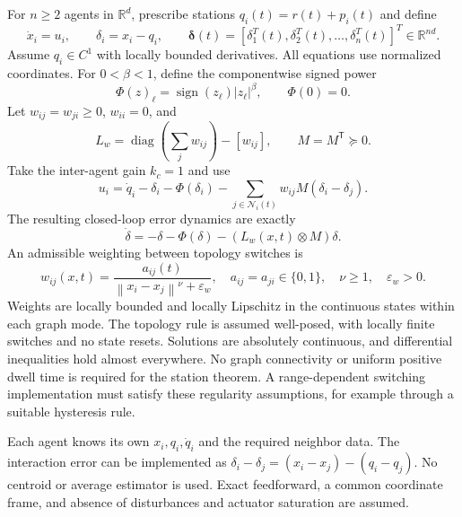 \documentclass[11pt,a4paper]{article}
\theoremstyle{remark}
\newcommand{\R}{\mathbb R}
\newcommand{\norm}[1]{\left\lVert#1\right\rVert}
\newcommand{\transpose}{^{\mathsf T}}
\newcommand{\epsreg}{\varepsilon_w}
\begin{document}
For $n\ge2$ agents in $\R^d$, prescribe stations $q_i(t)=r(t)+p_i(t)$ and define
\begin{equation}
\dot x_i=u_i,\qquad \delta_i=x_i-q_i,\qquad
\boldsymbol{\delta}(t) = [\delta_1^T(t), \delta_2^T(t), \dots, \delta_n^T(t)]^T \in \mathbb{R}^{nd}.
\label{eq:plant}
\end{equation}
Assume $q_i\in C^1$ with locally bounded derivatives. All equations use normalized coordinates. For $0<\beta<1$, define the componentwise signed power
\begin{equation}
\Phi(z)_\ell=\operatorname{sign}(z_\ell)|z_\ell|^\beta,
\qquad \Phi(0)=0.
\label{eq:phi}
\end{equation}
Let $w_{ij}=w_{ji}\ge0$, $w_{ii}=0$, and
\begin{equation}
L_w=\operatorname{diag}\!\left(\sum_jw_{ij}\right)-[w_{ij}],
\qquad M=M\transpose\succeq0.
\label{eq:laplacian}
\end{equation}
Take the inter-agent gain $k_c=1$ and use
\begin{equation}
\boxed{\quad
u_i=\dot q_i-\delta_i-\Phi(\delta_i)
-\sum_{j\in\mathcal N_i(t)}w_{ij}M(\delta_i-\delta_j).
\quad}
\label{eq:controller}
\end{equation}
The resulting closed-loop error dynamics are exactly
\begin{equation}
\boxed{\quad
\dot\delta=-\delta-\Phi(\delta)-(L_w(x,t)\otimes M)\delta.
\quad}
\label{eq:closed}
\end{equation}
An admissible weighting between topology switches is
\begin{equation}
w_{ij}(x,t)=\frac{a_{ij}(t)}{\norm{x_i-x_j}^{\nu}+\epsreg},
\quad a_{ij}=a_{ji}\in\{0,1\},\quad \nu\ge1,\quad\epsreg>0.
\label{eq:weights}
\end{equation}
Weights are locally bounded and locally Lipschitz in the continuous states within each graph mode. The topology rule is assumed well-posed, with locally finite switches and no state resets. Solutions are absolutely continuous, and differential inequalities hold almost everywhere. No graph connectivity or uniform positive dwell time is required for the station theorem. A range-dependent switching implementation must satisfy these regularity assumptions, for example through a suitable hysteresis rule.

Each agent knows its own $x_i,q_i,\dot q_i$ and the required neighbor data. The interaction error can be implemented as
$\delta_i-\delta_j=(x_i-x_j)-(q_i-q_j)$. No centroid or average estimator is used. Exact feedforward, a common coordinate frame, and absence of disturbances and actuator saturation are assumed.
\end{document}
